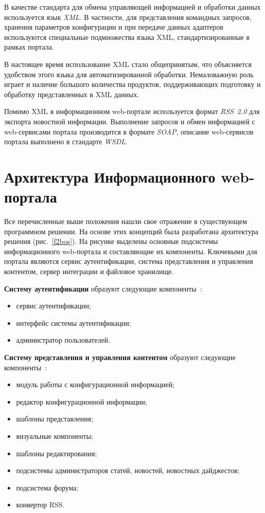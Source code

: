 \begin{multicols}{2}
 В качестве стандарта для обмена управляющей информацией и обработки данных
используется язык \textit{XML}. В частности, для представления командных запросов,
хранения параметров конфигурации и при передаче данных адаптеров используются
специальные подмножества языка XML, стандартизированные в рамках портала.

 В настоящее время использование XML стало общепринятым, что объясняется
удобством этого языка для автоматизированной обработки. Немаловажную роль играет и
наличие большого количества продуктов, поддерживающих подготовку и обработку
представленных в XML данных.

 Помимо XML в информационном web-портале используется формат
\textit{RSS~2.0} для экспорта новостной информации. Выполнение запросов и обмен
информацией с web-сервисами портала производится в формате \textit{SOAP}, описание
web-сервисов портала выполнено в стандарте \textit{WSDL}.

\section{Архитектура Информационного web-портала} %

 Все перечисленные выше положения нашли свое отражение в существующем
программном решении. На основе этих концепций была разработана архитектура
решения (рис.~\ref{f2bos}). На рисунке выделены основные подсистемы
информационного web-портала и составляющие их компоненты. Ключевыми для
портала являются сервис аутентификации, система представления и управления
контентом, сервер интеграции и файловое хранилище.


 \textbf{Систему аутентификации} образуют следующие компоненты~\cite{11bos}:
 \begin{itemize}
\item сервис аутентификации;
\item интерфейс системы аутентификации;
\item администратор пользователей.
\end{itemize}

 \textbf{Систему представления и управления контентом} образуют следующие
компоненты~\cite{5bos}:
 \begin{itemize}
\item модуль работы с конфигурационной информацией;
\item редактор конфигурационной информации;
\item шаблоны представления;
\item визуальные компоненты;
\item шаблоны редактирования;
\item подсистемы администраторов статей, но\-во\-стей, новостных дайджестов;
\item подсистема форума;
\item конвертор RSS.
\end{itemize}



\end{multicols}
